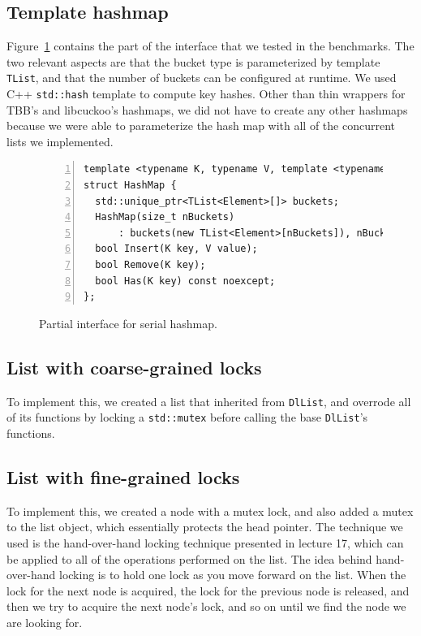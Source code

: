 \documentclass[11pt]{article}
\begin{document}
\subsection{Template hashmap}
Figure~\ref{fig:hashmap} contains the part of the interface that we tested in
the benchmarks. The two relevant aspects are that the bucket type is
parameterized by template {\tt TList}, and that the number of buckets can be
configured at runtime. We used C++ {\tt std::hash} template to compute key
hashes. Other than thin wrappers for TBB's and libcuckoo's hashmaps, we did not
have to create any other hashmaps because we were able to parameterize the hash
map with all of the concurrent lists we implemented.

\begin{figure}
\begin{center}
\begin{lstlisting}[numbers=left]
template <typename K, typename V, template <typename> class TList>
struct HashMap {
  std::unique_ptr<TList<Element>[]> buckets;
  HashMap(size_t nBuckets)
      : buckets(new TList<Element>[nBuckets]), nBuckets(nBuckets) {}
  bool Insert(K key, V value);
  bool Remove(K key);
  bool Has(K key) const noexcept;
};
\end{lstlisting}
\caption{Partial interface for serial hashmap.}
\label{fig:hashmap}
\end{center}
\end{figure}

\subsection{List with coarse-grained locks}
To implement this, we created a list that inherited from {\tt DlList}, and
overrode all of its functions by locking a {\tt std::mutex} before calling the
base {\tt DlList}'s functions.

\subsection{List with fine-grained locks}
To implement this, we created a node with a mutex lock, and also added a mutex
to the list object, which essentially protects the head pointer. The technique
we used is the hand-over-hand locking technique presented in lecture 17, which
can be applied to all of the operations performed on the list. The idea behind
hand-over-hand locking is to hold one lock as you move forward on the list. When
the lock for the next node is acquired, the lock for the previous node is
released, and then we try to acquire the next node's lock, and so on until we
find the node we are looking for.
\end{document}
